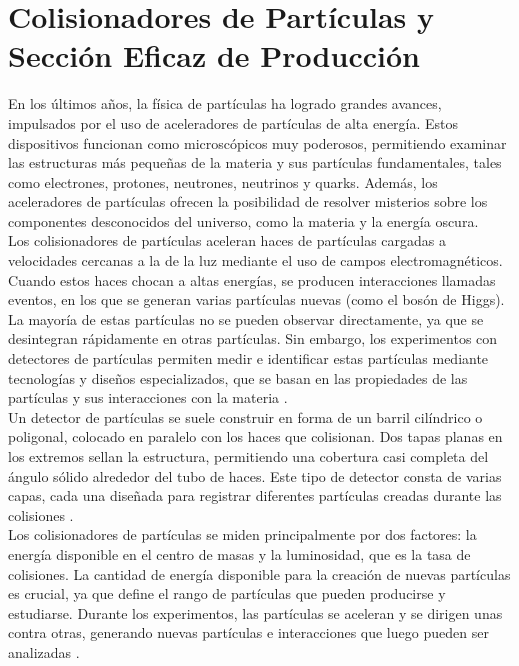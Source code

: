 \section{Colisionadores de Partículas y Sección Eficaz de Producción}

En los últimos años, la física de partículas ha logrado grandes avances, impulsados por el uso de aceleradores de partículas de alta energía. Estos dispositivos funcionan como microscópicos muy poderosos, permitiendo examinar las estructuras más pequeñas de la materia y sus partículas fundamentales, tales como electrones, protones, neutrones, neutrinos y quarks. Además, los aceleradores de partículas ofrecen la posibilidad de resolver misterios sobre los componentes desconocidos del universo, como la materia y la energía oscura.\\

Los colisionadores de partículas aceleran haces de partículas cargadas a velocidades cercanas a la de la luz mediante el uso de campos electromagnéticos. Cuando estos haces chocan a altas energías, se producen interacciones llamadas eventos, en los que se generan varias partículas nuevas (como el bosón de Higgs). La mayoría de estas partículas no se pueden observar directamente, ya que se desintegran rápidamente en otras partículas. Sin embargo, los experimentos con detectores de partículas permiten medir e identificar estas partículas mediante tecnologías y diseños especializados, que se basan en las propiedades de las partículas y sus interacciones con la materia \cite{thomson_2013}.\\

Un detector de partículas se suele construir en forma de un barril cilíndrico o poligonal, colocado en paralelo con los haces que colisionan. Dos tapas planas en los extremos sellan la estructura, permitiendo una cobertura casi completa del ángulo sólido alrededor del tubo de haces. Este tipo de detector consta de varias capas, cada una diseñada para registrar diferentes partículas creadas durante las colisiones \cite{thomson_2013}.\\

Los colisionadores de partículas se miden principalmente por dos factores: la energía disponible en el centro de masas y la luminosidad, que es la tasa de colisiones. La cantidad de energía disponible para la creación de nuevas partículas es crucial, ya que define el rango de partículas que pueden producirse y estudiarse. Durante los experimentos, las partículas se aceleran y se dirigen unas contra otras, generando nuevas partículas e interacciones que luego pueden ser analizadas \cite{undergraduate_accelerators_chapter}.\\

